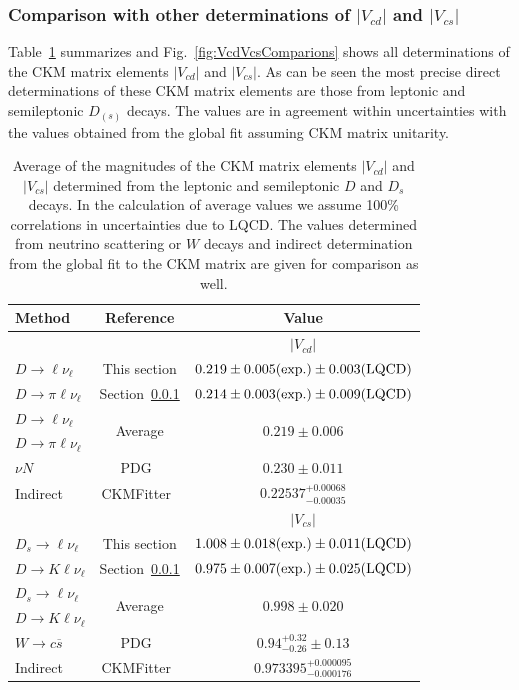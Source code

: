\subsubsection{Comparison with other determinations of $|V_{cd}|$ and $|V_{cs}|$}

Table~\ref{tab:CKMVcdVcs} summarizes and Fig.~\ref{fig:VcdVcsComparions} shows all determinations of the CKM matrix elements $|V_{cd}|$ and $|V_{cs}|$. As
can be seen the most precise direct determinations of these CKM matrix elements are those from leptonic and semileptonic $D_{(s)}$ decays. The values are in agreement
within uncertainties with the values obtained from the global fit assuming CKM matrix unitarity.
\begin{table}[htb]
\caption{Average of the magnitudes of the CKM matrix elements $|V_{cd}|$ and $|V_{cs}|$ determined from the leptonic and semileptonic $D$ and $D_s$ decays.
In the calculation of average values we assume 100\% correlations in uncertainties due to LQCD.  The values determined from neutrino scattering 
or $W$ decays and indirect determination from the global fit to the CKM matrix are given for comparison as well.
\label{tab:CKMVcdVcs}}
\begin{center}
\begin{tabular}{lcc}
\toprule
\rowcolor{gray} Method & Reference & Value \\ 
\midrule
&&{$|V_{cd}|$}\\
\cline{3-3}
$D\to\ell\nu_{\ell}$ 	 & This section			& $0.219\pm0.005(\rm exp.)\pm0.003(\rm LQCD)$\\
$D\to\pi\ell\nu_{\ell}$  & Section~\ref{}		& $0.214\pm0.003(\rm exp.)\pm0.009(\rm LQCD)$\\
\midrule
\rowcolor{gray} $D\to\ell\nu_{\ell}$ 	& \multirow{2}{*}{Average}	& \multirow{2}{*}{$0.219\pm0.006$}\\
\rowcolor{gray} $D\to\pi\ell\nu_{\ell}$ & \multirow{-2}{*}{Average}	& \multirow{-2}{*}{$0.219\pm0.006$}\\
\midrule
$\nu N$			& PDG~\cite{PDG_2012}	& $0.230\pm0.011$\\
Indirect		& CKMFitter~\cite{}		& $0.22537^{+0.00068}_{-0.00035}$\\
\midrule
\midrule
&&{$|V_{cs}|$}\\
\cline{3-3}
$D_s\to\ell\nu_{\ell}$ 	 & This section			& $1.008\pm0.018(\rm exp.)\pm0.011(\rm LQCD)$\\
$D\to K\ell\nu_{\ell}$   & Section~\ref{}		& $0.975\pm0.007(\rm exp.)\pm0.025(\rm LQCD)$\\
\midrule
\rowcolor{gray} $D_s\to\ell\nu_{\ell}$ 	& \multirow{2}{*}{Average}	& \multirow{2}{*}{$0.998\pm0.020$}\\
\rowcolor{gray} $D\to K\ell\nu_{\ell}$ & \multirow{-2}{*}{Average}	& \multirow{-2}{*}{$0.998\pm0.020$}\\
\midrule
$W\to c\overline{s}$	& PDG~\cite{PDG_2012}	& $0.94^{+0.32}_{-0.26}\pm0.13$\\
Indirect		& CKMFitter~\cite{}		& $0.973395^{+0.000095}_{-0.000176}$\\
\bottomrule
\end{tabular}
\end{center}
\end{table}

